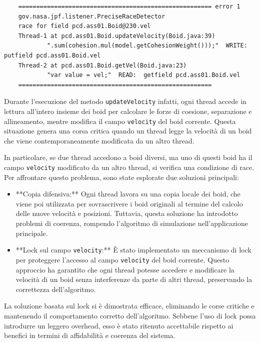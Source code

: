 \documentclass[a4paper,12pt]{report}
\begin{document}
\begin{verbatim}
    ====================================================== error 1
    gov.nasa.jpf.listener.PreciseRaceDetector
    race for field pcd.ass01.Boid@230.vel
    Thread-1 at pcd.ass01.Boid.updateVelocity(Boid.java:39)
            ".sum(cohesion.mul(model.getCohesionWeight()));"  WRITE: putfield pcd.ass01.Boid.vel
    Thread-2 at pcd.ass01.Boid.getVel(Boid.java:23)
            "var value = vel;"  READ:  getfield pcd.ass01.Boid.vel
    ======================================================
\end{verbatim}

Durante l'esecuzione del metodo \texttt{updateVelocity} infatti, ogni thread accede in lettura all'intero insieme dei boid per calcolare le forze di coesione, separazione e allineamento, mentre modifica il campo \texttt{velocity} del boid corrente. Questa situazione genera una corsa critica quando un thread legge la velocità di un boid che viene contemporaneamente modificata da un altro thread.

In particolare, se due thread accedono a boid diversi, ma uno di questi boid ha il campo \texttt{velocity} modificato da un altro thread, si verifica una condizione di race. Per affrontare questo problema, sono state esplorate due soluzioni principali:

\begin{itemize}
    \item **Copia difensiva:** Ogni thread lavora su una copia locale dei boid, che viene poi utilizzata per sovrascrivere i boid originali al termine del calcolo delle nuove velocità e posizioni. Tuttavia, questa soluzione ha introdotto problemi di coerenza, rompendo l'algoritmo di simulazione nell'applicazione principale.
    \item **Lock sul campo \texttt{velocity}:** È stato implementato un meccanismo di lock per proteggere l'accesso al campo \texttt{velocity} del boid corrente. Questo approccio ha garantito che ogni thread potesse accedere e modificare la velocità di un boid senza interferenze da parte di altri thread, preservando la correttezza dell'algoritmo.
\end{itemize}

La soluzione basata sul lock si è dimostrata efficace, eliminando le corse critiche e mantenendo il comportamento corretto dell'algoritmo. Sebbene l'uso di lock possa introdurre un leggero overhead, esso è stato ritenuto accettabile rispetto ai benefici in termini di affidabilità e coerenza del sistema.
\end{document}
